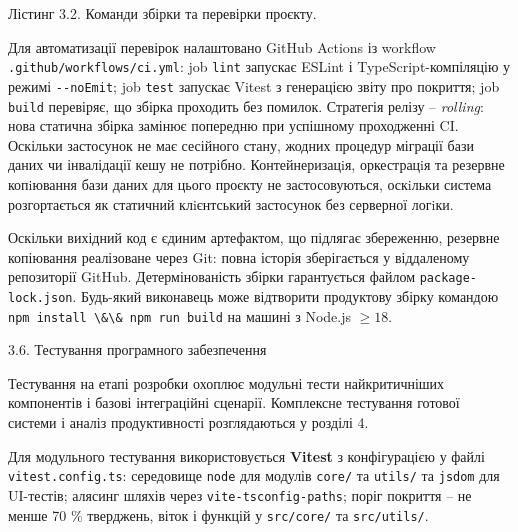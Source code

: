 \documentclass[
]{article}
\newcommand{\passthrough}[1]{#1}
\begin{document}
Лістинг 3.2. Команди збірки та перевірки проєкту.

Для автоматизації перевірок налаштовано GitHub Actions із workflow
\passthrough{\lstinline!.!}\passthrough{\lstinline!github!}\passthrough{\lstinline!/!}\passthrough{\lstinline!workflows!}\passthrough{\lstinline!/!}\passthrough{\lstinline!ci!}\passthrough{\lstinline!.!}\passthrough{\lstinline!yml!}:
job \passthrough{\lstinline!lint!} запускає ESLint і
TypeScript-компіляцію у режимі
\passthrough{\lstinline!--!}\passthrough{\lstinline!noEmit!}; job
\passthrough{\lstinline!test!} запускає Vitest з генерацією звіту про
покриття; job \passthrough{\lstinline!build!} перевіряє, що збірка
проходить без помилок. Стратегія релізу -- \emph{rolling}: нова статична
збірка замінює попередню при успішному проходженні CI. Оскільки
застосунок не має сесійного стану, жодних процедур міграції бази даних
чи інвалідації кешу не потрібно. Контейнеризацiя, оркестрацiя та
резервне копiювання бази даних для цього проєкту не застосовуються,
оскiльки система розгортається як статичний клiєнтський застосунок без
серверної логiки.

Оскільки вихідний код є єдиним артефактом, що підлягає збереженню,
резервне копіювання реалізоване через Git: повна історія зберігається у
віддаленому репозиторії GitHub. Детермінованість збірки гарантується
файлом
\passthrough{\lstinline!package!}\passthrough{\lstinline!-!}\passthrough{\lstinline!lock!}\passthrough{\lstinline!.!}\passthrough{\lstinline!json!}.
Будь-який виконавець може відтворити продуктову збірку командою
\passthrough{\lstinline!npm!}\passthrough{\lstinline! !}\passthrough{\lstinline!install!}\passthrough{\lstinline! !}\passthrough{\lstinline!\&\&!}\passthrough{\lstinline! !}\passthrough{\lstinline!npm!}\passthrough{\lstinline! !}\passthrough{\lstinline!run!}\passthrough{\lstinline! !}\passthrough{\lstinline!build!}
на машині з Node.js \(\geq 18\).

\protect{}\label{X8f3ee387a6af2e6a42daf1c469a75f69834e211}{}3.6.
Тестування програмного забезпечення

Тестування на етапі розробки охоплює модульні тести найкритичніших
компонентів і базові інтеграційні сценарії. Комплексне тестування
готової системи і аналіз продуктивності розглядаються у розділі 4.

Для модульного тестування використовується \textbf{Vitest} з
конфігурацією у файлі
\passthrough{\lstinline!vitest!}\passthrough{\lstinline!.!}\passthrough{\lstinline!config!}\passthrough{\lstinline!.!}\passthrough{\lstinline!ts!}:
середовище \passthrough{\lstinline!node!} для модулів
\passthrough{\lstinline!core!}\passthrough{\lstinline!/!} та
\passthrough{\lstinline!utils!}\passthrough{\lstinline!/!} та
\passthrough{\lstinline!jsdom!} для UI-тестів; алясинг шляхів через
\passthrough{\lstinline!vite!}\passthrough{\lstinline!-!}\passthrough{\lstinline!tsconfig!}\passthrough{\lstinline!-!}\passthrough{\lstinline!paths!};
поріг покриття -- не менше 70 \% тверджень, віток і функцій у
\passthrough{\lstinline!src!}\passthrough{\lstinline!/!}\passthrough{\lstinline!core!}\passthrough{\lstinline!/!}
та
\passthrough{\lstinline!src!}\passthrough{\lstinline!/!}\passthrough{\lstinline!utils!}\passthrough{\lstinline!/!}.
\end{document}
